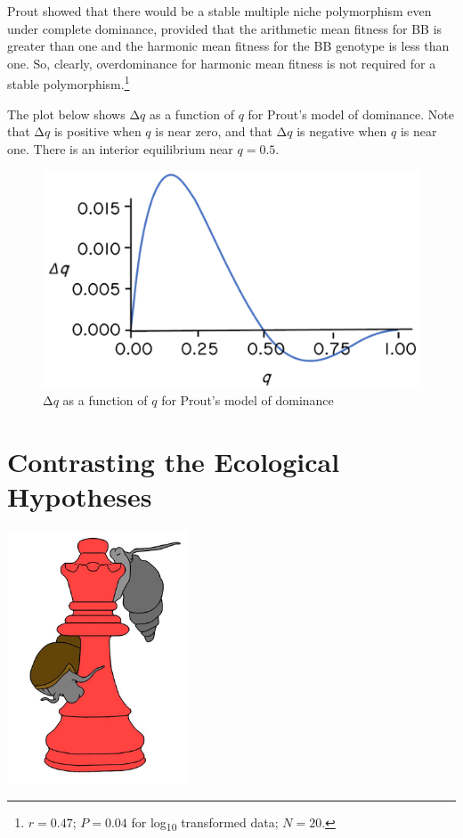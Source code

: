 \documentclass[
  letterpaper,
]{book}
\begin{document}
Prout showed that there would be a stable multiple niche polymorphism
even under complete dominance, provided that the arithmetic mean fitness
for BB is greater than one and the harmonic mean fitness for the BB
genotype is less than one. So, clearly, overdominance for harmonic mean
fitness is not required for a stable polymorphism.\footnote{\(r = 0.47\);
  \(P = 0.04\) for log\textsubscript{10} transformed data; \(N = 20\).}

The plot below shows \(\mathrm{\Delta}q\) as a function of \(q\) for
Prout's model of dominance. Note that \(\mathrm{\Delta}q\) is positive
when \(q\) is near zero, and that \(\mathrm{\Delta}q\) is negative when
\(q\) is near one. There is an interior equilibrium near \(q = 0.5\).

\begin{figure}[H]

{\centering \includegraphics{images/fig2-5_hr.png}

}

\caption[Prout's model of dominance]{\(\mathrm{\Delta}q\) as a function
of \(q\) for Prout's model of dominance}

\end{figure}%


\chapter{Contrasting the Ecological Hypotheses}\label{sec-eco-hyp-cont}

\begin{center}
\includegraphics[width=0.4\textwidth,height=\textheight]{images/fig3-1.jpeg}
\end{center}
\end{document}
